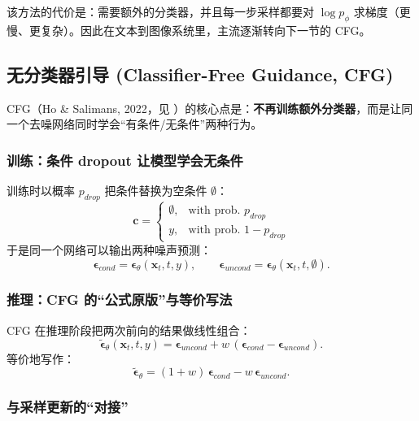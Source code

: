 \documentclass[zihao=-4, fontset=windows]{ctexart}
\begin{document}
该方法的代价是：需要额外的分类器，并且每一步采样都要对 $\log p_\phi$ 求梯度（更慢、更复杂）。因此在文本到图像系统里，主流逐渐转向下一节的 CFG。

\subsection{无分类器引导 (Classifier-Free Guidance, CFG)}

CFG（Ho \& Salimans, 2022，见 \cite{ho2021classifier}）的核心点是：\textbf{不再训练额外分类器}，而是让同一个去噪网络同时学会“有条件/无条件”两种行为。

\subsubsection{训练：条件 dropout 让模型学会无条件}

训练时以概率 $p_{drop}$ 把条件替换为空条件 $\emptyset$：
\begin{equation}
    \mathbf{c}=\begin{cases}
    \emptyset, & \text{with prob. } p_{drop}\\
    y, & \text{with prob. } 1-p_{drop}
    \end{cases}
\end{equation}
于是同一个网络可以输出两种噪声预测：
\begin{equation}
    \boldsymbol\epsilon_{cond}=\boldsymbol\epsilon_\theta(\mathbf{x}_t,t,y),\qquad
    \boldsymbol\epsilon_{uncond}=\boldsymbol\epsilon_\theta(\mathbf{x}_t,t,\emptyset).
\end{equation}

\subsubsection{推理：CFG 的“公式原版”与等价写法}

CFG 在推理阶段把两次前向的结果做线性组合：
\begin{equation}
    \tilde{\boldsymbol\epsilon}_\theta(\mathbf{x}_t,t,y)=\boldsymbol\epsilon_{uncond}+w\,(\boldsymbol\epsilon_{cond}-\boldsymbol\epsilon_{uncond}).
\end{equation}
等价地写作：
\begin{equation}
    \tilde{\boldsymbol\epsilon}_\theta=(1+w)\,\boldsymbol\epsilon_{cond}-w\,\boldsymbol\epsilon_{uncond}.
\end{equation}

\subsubsection{与采样更新的“对接”}
\end{document}
